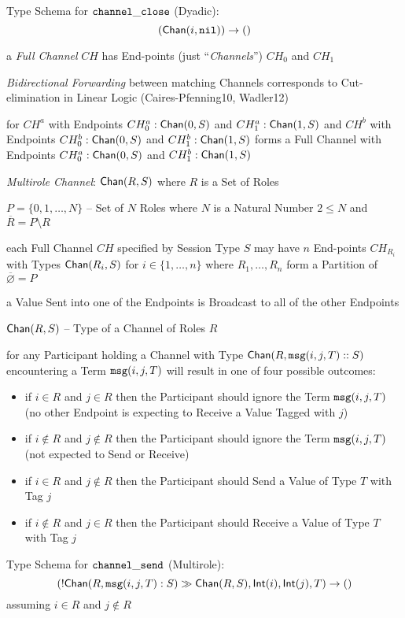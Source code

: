 Type Schema for $\mathtt{channel\_close}$ (Dyadic):
\[
  (\mathsf{Chan}(i, \mathtt{nil})) \rightarrow \mathsf{()}
\]

a \emph{Full Channel} $CH$ has End-points (just ``\emph{Channels}'')
$CH_0$ and $CH_1$


\emph{Bidirectional Forwarding} between matching Channels corresponds
to Cut-elimination in Linear Logic (Caires-Pfenning10, Wadler12)

for $CH^a$ with Endpoints $CH^a_0 : \mathsf{Chan}(0,S)$ and $CH^a_1 :
\mathsf{Chan}(1,S)$ and $CH^b$ with Endpoints $CH^b_0 : \mathsf{Chan}(0,S)$ and
$CH^b_1 : \mathsf{Chan}(1,S)$ forms a Full Channel with Endpoints $CH^a_0 :
\mathsf{Chan}(0,S)$ and $CH^b_1 : \mathsf{Chan}(1,S)$


\emph{Multirole Channel}: $\mathsf{Chan}(R,S)$ where $R$ is a Set of Roles

$P = \{0, 1, \ldots, N\}$ -- Set of $N$ Roles where $N$ is a Natural
Number $2 \leq N$ and $\overline{R} = P \setminus R$

each Full Channel $CH$ specified by Session Type $S$ may have $n$
End-points $CH_{R_i}$ with Types $\mathsf{Chan}(R_i,S)$ for $i \in
\{1,\ldots,n\}$ where $R_1, \ldots, R_n$ form a Partition of
$\overline{\varnothing} = P$

a Value Sent into one of the Endpoints is Broadcast to all of the
other Endpoints

$\mathsf{Chan}(R,S)$ -- Type of a Channel of Roles $R$

for any Participant holding a Channel with Type $\mathsf{Chan}(R,
\mathtt{msg}(i,j,T)::S)$ encountering a Term $\mathtt{msg}(i,j,T)$ will result in one
of four possible outcomes:
\begin{itemize}
  \item if $i \in R$ and $j \in R$ then the Participant should ignore
    the Term $\mathtt{msg}(i,j,T)$ (no other Endpoint is expecting to Receive
    a Value Tagged with $j$)
  \item if $i \notin R$ and $j \notin R$ then the Participant should
    ignore the Term $\mathtt{msg}(i,j,T)$ (not expected to Send or Receive)
  \item if $i \in R$ and $j \notin R$ then the Participant should Send
    a Value of Type $T$ with Tag $j$
  \item if $i \notin R$ and $j \in R$ then the Participant should
    Receive a Value of Type $T$ with Tag $j$
\end{itemize}

Type Schema for $\mathtt{channel\_send}$ (Multirole):
\[
  (!\mathsf{Chan} (R, \mathtt{msg}(i,j,T):S) \gg \mathsf{Chan}(R,S), \mathsf{Int}(i), \mathsf{Int}(j), T)
    \rightarrow \mathsf{()}
\]
assuming $i \in R$ and $j \notin R$

